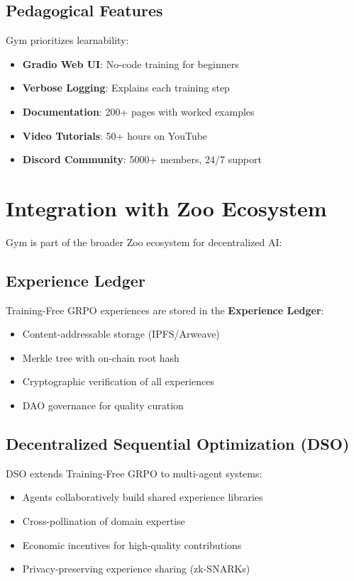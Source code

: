 \documentclass[11pt,letterpaper]{article}
\begin{document}
\subsection{Pedagogical Features}

Gym prioritizes learnability:

\begin{itemize}
\item \textbf{Gradio Web UI}: No-code training for beginners
\item \textbf{Verbose Logging}: Explains each training step
\item \textbf{Documentation}: 200+ pages with worked examples
\item \textbf{Video Tutorials}: 50+ hours on YouTube
\item \textbf{Discord Community}: 5000+ members, 24/7 support
\end{itemize}

\section{Integration with Zoo Ecosystem}

Gym is part of the broader Zoo ecosystem for decentralized AI:

\subsection{Experience Ledger}

Training-Free GRPO experiences are stored in the \textbf{Experience Ledger}:
\begin{itemize}
\item Content-addressable storage (IPFS/Arweave)
\item Merkle tree with on-chain root hash
\item Cryptographic verification of all experiences
\item DAO governance for quality curation
\end{itemize}

\subsection{Decentralized Sequential Optimization (DSO)}

DSO extends Training-Free GRPO to multi-agent systems:
\begin{itemize}
\item Agents collaboratively build shared experience libraries
\item Cross-pollination of domain expertise
\item Economic incentives for high-quality contributions
\item Privacy-preserving experience sharing (zk-SNARKs)
\end{itemize}
\end{document}
